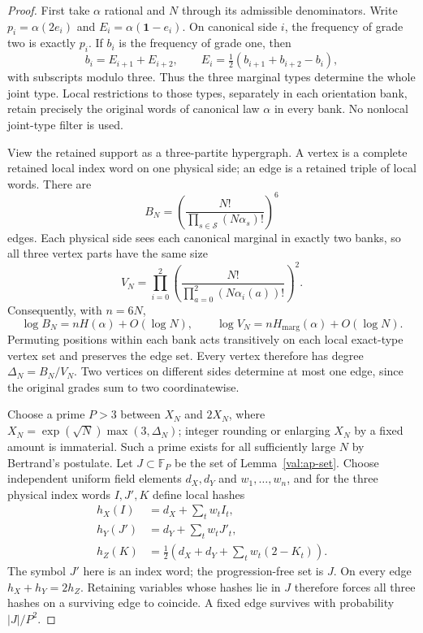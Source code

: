 \documentclass[11pt]{article}
\numberwithin{equation}{section}
\theoremstyle{definition}
\theoremstyle{remark}
\begin{document}
\begin{proof}
First take $\alpha$ rational and $N$ through its admissible denominators.
Write $p_i=\alpha(2e_i)$ and $E_i=\alpha(\mathbf1-e_i)$.  On canonical
side $i$, the frequency of grade two is exactly $p_i$.  If $b_i$ is the
frequency of grade one, then
\[
 b_i=E_{i+1}+E_{i+2},\qquad
 E_i=\tfrac12(b_{i+1}+b_{i+2}-b_i),
\]
with subscripts modulo three.  Thus the three marginal types determine the
whole joint type.  Local restrictions to those types, separately in each
orientation bank, retain precisely the original words of canonical law
$\alpha$ in every bank.  No nonlocal joint-type filter is used.

View the retained support as a three-partite hypergraph.  A vertex is a
complete retained local index word on one physical side; an edge is a
retained triple of local words.  There are
\[
 B_N=\left(\frac{N!}{\prod_{s\in\mathcal S}(N\alpha_s)!}\right)^6
\]
edges.  Each physical side sees each canonical marginal in exactly two
banks, so all three vertex parts have the same size
\[
 V_N=\prod_{i=0}^2
 \left(\frac{N!}{\prod_{a=0}^2(N\alpha_i(a))!}\right)^2.
\]
Consequently, with $n=6N$,
\begin{equation}
 \log B_N=nH(\alpha)+O(\log N),\qquad
 \log V_N=nH_{\mathrm{marg}}(\alpha)+O(\log N).
\label{val:matching-counts}
\end{equation}
Permuting positions within each bank acts transitively on each local
exact-type vertex set and preserves the edge set.  Every vertex therefore
has degree $\Delta_N=B_N/V_N$.  Two vertices on different sides determine
at most one edge, since the original grades sum to two coordinatewise.

Choose a prime $P>3$ between $X_N$ and $2X_N$, where
$X_N=\exp(\sqrt N)\max(3,\Delta_N)$; integer rounding or enlarging $X_N$
by a fixed amount is immaterial.  Such a prime exists for all sufficiently
large $N$ by Bertrand's postulate.  Let $J\subset\mathbb F_P$ be the set
of Lemma~\ref{val:ap-set}.  Choose independent uniform field elements
$d_X,d_Y$ and $w_1,\ldots,w_n$, and for the three physical index words
$I,J',K$ define local hashes
\begin{align*}
 h_X(I)&=d_X+\sum_t w_t I_t,\\
 h_Y(J')&=d_Y+\sum_t w_t J'_t,\\
 h_Z(K)&=\tfrac12\left(d_X+d_Y+\sum_t w_t(2-K_t)\right).
\end{align*}
The symbol $J'$ here is an index word; the progression-free set is $J$.
On every edge $h_X+h_Y=2h_Z$.  Retaining variables whose hashes lie in
$J$ therefore forces all three hashes on a surviving edge to coincide.
A fixed edge survives with probability $|J|/P^2$.


\end{proof}
\end{document}
